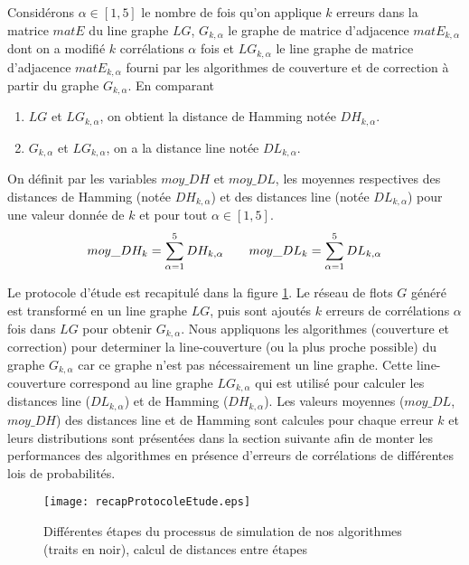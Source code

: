 \documentclass[onecolumn, 12pt]{book}
\begin{document}
Consid\'erons 
  $\alpha \in [1, 5]$ le nombre de fois qu'on applique $k$ erreurs dans la matrice $matE$ du line graphe $LG$,  
 $G_{k, \alpha}$ le graphe de matrice d'adjacence $matE_{k, \alpha}$ dont on a modifi\'e $k$ corr\'elations $\alpha$ fois et 
 $LG_{k, \alpha}$  le line graphe de matrice d'adjacence $matE_{k, \alpha}$ fourni par les algorithmes de couverture et de correction \`a partir du graphe $G_{k, \alpha}$.
\newline
En comparant
\begin{enumerate}
\item  $LG$ et $LG_{k, \alpha}$, on obtient la distance de Hamming not\'ee $DH_{k,\alpha}$.
\item $G_{k,\alpha}$ et $LG_{k,\alpha}$, on a la distance line not\'ee $DL_{k,\alpha}$.
\end{enumerate}
On d\'efinit par les variables $moy\_DH$ et $moy\_DL$, les moyennes respectives des distances de Hamming (not\'ee $DH_{k,\alpha}$) et des distances line (not\'ee $DL_{k,\alpha}$) pour une valeur donn\'ee de $k$ et pour tout $\alpha \in [1, 5]$.
\begin{equation}
moy\_DH_k = \sum_{\alpha = 1}^{5} DH_{k, \alpha} \hspace{2 em}
moy\_DL_k = \sum_{\alpha = 1}^{5} DL_{k, \alpha}
\end{equation}

Le protocole d'\'etude est recapitul\'e dans la figure \ref{recap_protocole_etude}. Le r\'eseau de flots $G$ g\'en\'er\'e est transform\'e en un line graphe $LG$, puis sont ajout\'es $k$ erreurs de corr\'elations $\alpha$ fois dans $LG$ pour obtenir $G_{k,\alpha}$. Nous appliquons les algorithmes (couverture et correction) pour determiner la line-couverture (ou la plus proche possible) du graphe $G_{k,\alpha}$ car ce graphe n'est pas n\'ecessairement un line graphe. Cette line-couverture correspond au line graphe $LG_{k, \alpha}$ qui est utilis\'e pour calculer les distances line ($DL_{k, \alpha}$) et de Hamming ($DH_{k, \alpha}$).
Les valeurs moyennes ($moy\_DL$, $moy\_DH$) des distances line et de Hamming sont calcules pour chaque erreur $k$ et leurs distributions sont pr\'esent\'ees dans la section suivante afin de monter les performances des algorithmes en pr\'esence d'erreurs de corr\'elations de diff\'erentes lois de probabilit\'es.
\begin{figure}[htb!] 
\centering
\texttt{[image: recapProtocoleEtude.eps]}
\caption{ Diff\'erentes \'etapes du processus de simulation de nos algorithmes (traits en noir), calcul de distances entre \'etapes}
\label{recap_protocole_etude} 
\end{figure}
  
\end{document}

